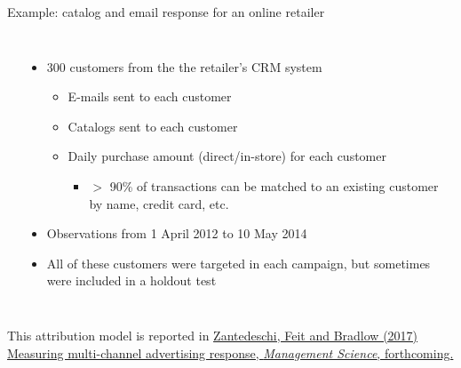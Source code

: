 \documentclass[10pt, aspectratio=169]{beamer}
\begin{document}
\begin{frame}{Example: catalog and email response for an online retailer}
\begin{columns}
\begin{center}
\end{center}
\begin{itemize}
\item 300 customers from the the retailer's CRM system
\begin{itemize}
\item E-mails sent to each customer
\item Catalogs sent to each customer
\item Daily purchase amount (direct/in-store) for each customer
\begin{itemize}
\item $>$ 90\% of transactions can be matched to an existing customer by name, credit card, etc.
\end{itemize}
\end{itemize}
\item Observations from 1 April 2012 to 10 May 2014
\item All of these customers were targeted in each campaign, but sometimes were included in a holdout test
\end{itemize}
\end{columns}
\bigskip \pause
This attribution model is reported in \href{https://github.com/eleafeit/ad_response_tutorial/blob/master/Papers/ZantedeschiFeitBradlow2017MeasuringMultichannelAdvertisingResponse.pdf}{Zantedeschi, Feit and Bradlow (2017) Measuring multi-channel advertising response, \emph{Management Science}, forthcoming.} 
\end{frame}
\end{document}
